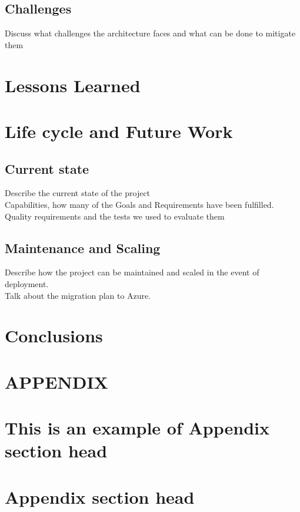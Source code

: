 \documentclass[prodmode,acmtecs]{acmsmall} %
\begin{document}
\subsection{Challenges}
Discuss what challenges the architecture faces and what can be done to mitigate them

\section{Lessons Learned}

\section{Life cycle and Future Work}
\subsection{Current state}
Describe the current state of the project\\
Capabilities, how many of the Goals and Requirements have been fulfilled.\\
Quality requirements and the tests we used to evaluate them\\

\subsection{Maintenance and Scaling}
Describe how the project can be maintained and scaled in the event of deployment.\\
Talk about the migration plan to Azure.\\


\section{Conclusions}


\appendix
\section*{APPENDIX}
\setcounter{section}{1}


\begin{acks}
\end{acks}  





\elecappendix

\medskip

\section{This is an example of Appendix section head}


\section{Appendix section head}
\end{document}
